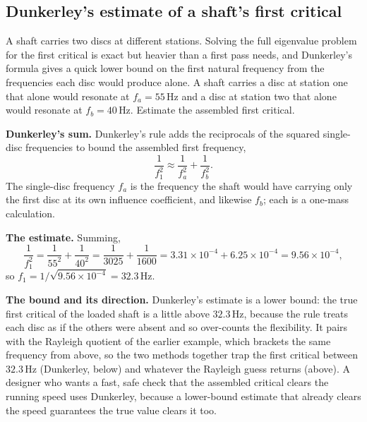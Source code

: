 \subsection{Dunkerley's estimate of a shaft's first critical}

A shaft carries two discs at different stations. Solving the full
eigenvalue problem for the first critical is exact but heavier than a
first pass needs, and Dunkerley's formula gives a quick lower bound on
the first natural frequency from the frequencies each disc would produce
alone. A shaft carries a disc at station one that alone would resonate at
$f_a = 55\,\si{\hertz}$ and a disc at station two that alone would
resonate at $f_b = 40\,\si{\hertz}$. Estimate the assembled first
critical.

\textbf{Dunkerley's sum.} Dunkerley's rule adds the reciprocals of the
squared single-disc frequencies to bound the assembled first frequency,
\[
\frac{1}{f_1^2} \approx \frac{1}{f_a^2} + \frac{1}{f_b^2}.
\]
The single-disc frequency $f_a$ is the frequency the shaft would have
carrying only the first disc at its own influence coefficient, and
likewise $f_b$; each is a one-mass calculation.

\textbf{The estimate.} Summing,
\[
\frac{1}{f_1^2} = \frac{1}{55^2} + \frac{1}{40^2} = \frac{1}{3025} +
\frac{1}{1600} = 3.31\times 10^{-4} + 6.25\times 10^{-4} = 9.56\times
10^{-4},
\]
so $f_1 = 1/\sqrt{9.56\times 10^{-4}} = 32.3\,\si{\hertz}$.

\textbf{The bound and its direction.} Dunkerley's estimate is a lower
bound: the true first critical of the loaded shaft is a little above
$32.3\,\si{\hertz}$, because the rule treats each disc as if the others
were absent and so over-counts the flexibility. It pairs with the
Rayleigh quotient of the earlier example, which brackets the same
frequency from above, so the two methods together trap the first
critical between $32.3\,\si{\hertz}$ (Dunkerley, below) and whatever the
Rayleigh guess returns (above). A designer who wants a fast, safe check
that the assembled critical clears the running speed uses Dunkerley,
because a lower-bound estimate that already clears the speed guarantees
the true value clears it too.

